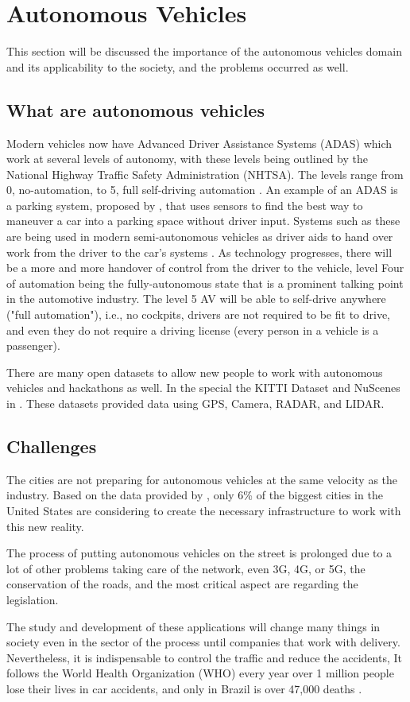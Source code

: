 \section{Autonomous Vehicles} \label{autonomous-vehicles}

This section will be discussed the importance of the autonomous vehicles domain and its applicability to the society, and the problems occurred as well. 

\subsection{What are autonomous vehicles}
Modern vehicles now have Advanced Driver Assistance Systems (ADAS)
which work at several levels of autonomy, with these levels being
outlined by the National Highway Traffic Safety Administration
(NHTSA). The levels range from 0, no-automation, to 5, full self-driving automation \cite{national2013preliminary}. An example of an ADAS is a parking system, proposed by \cite{krasner2016automatic}, that uses sensors to find the best way to maneuver a car into a parking space without driver input. Systems such as these are being used in modern semi-autonomous
vehicles as driver aids to hand over work from the driver to the
car’s systems \cite{schoning2006parklenkassistent}. As technology progresses, there will be a more
and more handover of control from the driver to the vehicle, level
Four of automation being the fully-autonomous state that is a prominent talking point in the automotive industry. The level 5 AV will
be able to self-drive anywhere ("full automation"), i.e., no cockpits,
drivers are not required to be fit to drive, and even they do not require a driving license (every person in a vehicle is a passenger).

There are many open datasets to allow new people to work with autonomous vehicles and hackathons as well. In the special the KITTI Dataset \cite{geiger2013vision} and NuScenes in \cite{caesar2020nuscenes}. These datasets provided data using GPS, Camera, RADAR, and LIDAR. 

\subsection{Challenges}

The cities are not preparing for autonomous vehicles at the same velocity as the industry. Based on the data provided by \cite{cutler2015many}, only 6\% of the biggest cities in the United States are considering to create the necessary infrastructure to work with this new reality.

The process of putting autonomous vehicles on the street is prolonged due to a lot of other problems taking care of the network, even 3G, 4G, or 5G, the conservation of the roads, and the most critical aspect are regarding the legislation. 

The study and development of these applications will change many things in society even in the sector of the process until companies that work with delivery. Nevertheless, it is indispensable to control the traffic and reduce the accidents, It follows the World Health Organization (WHO) every year over 1 million people lose their lives in car accidents, and only in Brazil is over 47,000 deaths \cite{world2004world}. 
